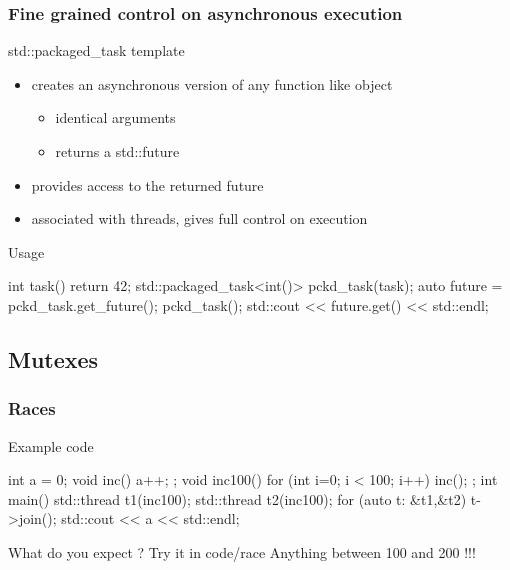 \begin{frame}[fragile]
  \frametitle{Fine grained control on asynchronous execution}
  \begin{block}{std::packaged\_task template}
    \begin{itemize}
    \item creates an asynchronous version of any function like object
      \begin{itemize}
      \item identical arguments
      \item returns a std::future
      \end{itemize}
    \item provides access to the returned future
    \item associated with threads, gives full control on execution
    \end{itemize}
  \end{block}
  \pause
  \begin{exampleblock}{Usage}
    \begin{cppcode*}{}
      int task() { return 42; }
      std::packaged_task<int()> pckd_task(task);
      auto future = pckd_task.get_future();
      pckd_task();
      std::cout << future.get() << std::endl;
    \end{cppcode*}
  \end{exampleblock}
\end{frame}

\subsection[mutex]{Mutexes}

\begin{frame}[fragile]
  \frametitle{Races}
  \begin{exampleblock}{Example code}
    \begin{cppcode*}{}
      int a = 0;
      void inc() { a++; };
      void inc100() {
        for (int i=0; i < 100; i++) inc();
      };
      int main() {
        std::thread t1(inc100);
        std::thread t2(inc100);
        for (auto t: {&t1,&t2}) t->join();
        std::cout << a << std::endl;
      }
    \end{cppcode*}
  \end{exampleblock}
  \pause
  \begin{block}{What do you expect ? Try it in code/race}
    \pause
    Anything between 100 and 200 !!!
  \end{block}
\end{frame}

